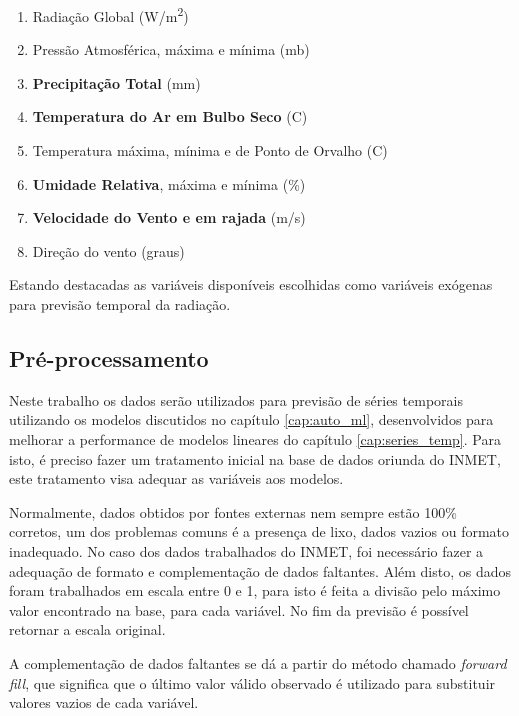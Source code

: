 \begin{enumerate}
    \item Radiação Global (W/m\textsuperscript{2})
    \item Pressão Atmosférica, máxima e mínima (mb)
    \item \textbf{Precipitação Total} (mm)
    \item \textbf{Temperatura do Ar em Bulbo Seco} (\textdegree{}C)
    \item Temperatura máxima, mínima e de Ponto de Orvalho (\textdegree{}C)
    \item \textbf{Umidade Relativa}, máxima e mínima (\%)
    \item \textbf{Velocidade do Vento e em rajada} (m/s)
    \item Direção do vento (graus)
\end{enumerate}

Estando destacadas as variáveis disponíveis escolhidas como variáveis exógenas para previsão temporal da radiação.

\subsection{Pré-processamento}

Neste trabalho os dados serão utilizados para previsão de séries temporais utilizando os modelos discutidos no capítulo \ref{cap:auto_ml}, desenvolvidos para melhorar a performance de modelos lineares do capítulo \ref{cap:series_temp}. Para isto, é preciso fazer um tratamento inicial na base de dados oriunda do INMET, este tratamento visa adequar as variáveis aos modelos. 

Normalmente, dados obtidos por fontes externas nem sempre estão 100\% corretos, um dos problemas comuns é a presença de lixo, dados vazios ou formato inadequado. No caso dos dados trabalhados do INMET, foi necessário fazer a adequação de formato e complementação de dados faltantes. Além disto, os dados foram trabalhados em escala entre 0 e 1, para isto é feita a divisão pelo máximo valor encontrado na base, para cada variável. No fim da previsão é possível retornar a escala original.

A complementação de dados faltantes se dá a partir do método chamado \textit{forward fill}, que significa que o último valor válido observado é utilizado para substituir valores vazios de cada variável.
